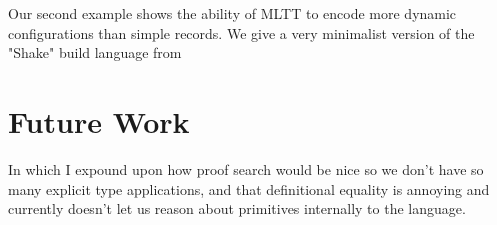 \documentclass{article}
\begin{document}
Our second example shows the ability of MLTT to encode more dynamic configurations than simple records.
We give a very minimalist version of the "Shake" build language from 

\section{Future Work}

In which I expound upon how proof search would be nice so we don't have so many explicit type applications, and that definitional equality is annoying and currently doesn't let us reason about primitives internally to the language.
\end{document}
